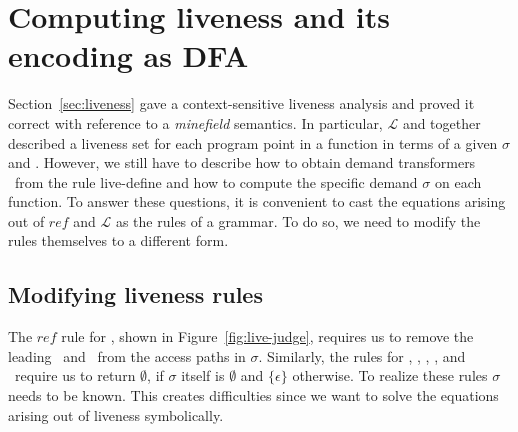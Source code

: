\documentclass[9pt]{sigplanconf}
\begin{document}
\section{Computing liveness and its encoding as DFA}\label{sec:computing}
Section~\ref{sec:liveness} gave  a context-sensitive liveness analysis
and  {\color  {red}  proved  it  correct  with  reference  to  a  {\em
    minefield} semantics}.  In  particular, $\mathcal{L}$ and 
together described a liveness set for each program point in a function
in terms of  a given $\sigma$ and \Lfonly.  However,  we still have to
describe how to obtain demand transformers \Lfonly\ from the rule {\sc
  live-define} and how to compute the specific demand $\sigma$ on each
function.
To  answer these  questions, it  is convenient  to cast  the equations
arising  out of  $\mathit{ref}$ and  $\mathcal{L}$ as  the rules  of a
grammar.   To do  so, we  need  to modify  the rules  themselves to  a
different form.

\subsection{Modifying liveness rules}

The      $\mathit{ref}$     rule      for     \CONS,      shown     in
Figure~\ref{fig:live-judge},  requires   us  to  remove   the  leading
\acar\ and \acdr\  from the access paths in  $\sigma$.  Similarly, the
rules for  \CAR, \CDR, \PRIM, \NULLQ,  and \SIF\ require  us to return
$\emptyset$, if  $\sigma$ itself is $\emptyset$ and
$\lbrace\epsilon\rbrace$ otherwise.  To  realize these rules
$\sigma$ needs to be known. This creates difficulties since we want to
solve the equations arising out of liveness symbolically.
\end{document}
